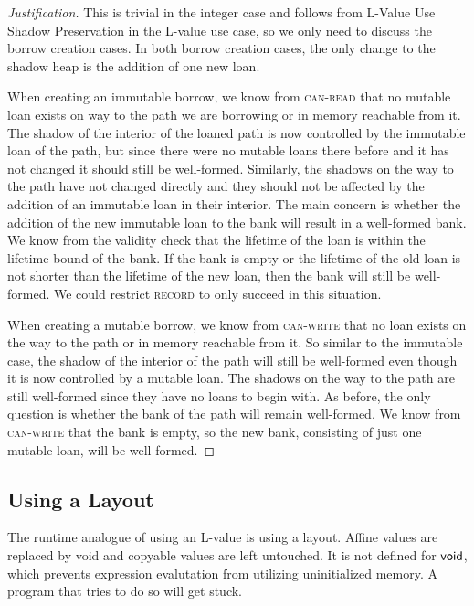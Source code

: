 \begin{proof}[Justification]
  This is trivial in the integer case and follows from L-Value Use Shadow Preservation
  in the L-value use case, so we only need to discuss the borrow creation cases.
  In both borrow creation cases, the only change to the shadow heap is the addition of
  one new loan.

  When creating an immutable borrow, we know from \textsc{can-read} that
  no mutable loan exists on way to the path we are borrowing or in memory reachable from it.
  The shadow of the interior of the loaned path is now controlled by the immutable loan
  of the path, but since there were no mutable loans there before and it has not changed
  it should still be well-formed. Similarly, the shadows on the way to the path have not changed
  directly and they should not be affected by the addition of an immutable loan in their
  interior. The main concern is whether the addition of the new immutable loan to the bank 
  will result in a well-formed bank. We know from the validity check that the lifetime
  of the loan is within the lifetime bound of the bank. If the bank is empty or
  the lifetime of the old loan is not shorter than the lifetime of the new loan, then
  the bank will still be well-formed. We could restrict \textsc{record} to only succeed
  in this situation.

  When creating a mutable borrow, we know from \textsc{can-write} that
  no loan exists on the way to the path or in memory reachable from it.
  So similar to the immutable case, the shadow of the interior of the path will still
  be well-formed even though it is now controlled by a mutable loan.
  The shadows on the way to the path are still well-formed since they have no loans to begin with.
  As before, the only question is whether the bank of the path will remain well-formed.
  We know from \textsc{can-write} that the bank is empty, so the new bank, consisting of
  just one mutable loan, will be well-formed.
\end{proof}

\subsection*{Using a Layout}
The runtime analogue of using an L-value is using a layout.
Affine values are replaced by void and copyable values are left untouched.
It is not defined for $\mathsf{void}$, which prevents expression evalutation from utilizing
uninitialized memory. A program that tries to do so will get stuck.
\newline

